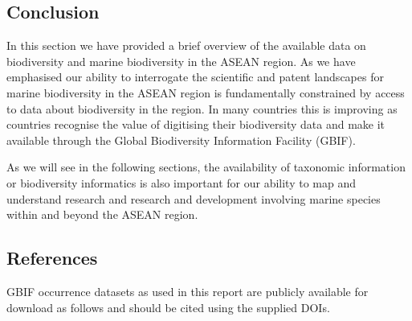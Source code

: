 \documentclass[]{book}
\theoremstyle{definition}
\theoremstyle{definition}
\theoremstyle{definition}
\theoremstyle{remark}
\begin{document}
\hypertarget{conclusion}{%
\subsection{Conclusion}\label{conclusion}}

In this section we have provided a brief overview of the available data
on biodiversity and marine biodiversity in the ASEAN region. As we have
emphasised our ability to interrogate the scientific and patent
landscapes for marine biodiversity in the ASEAN region is fundamentally
constrained by access to data about biodiversity in the region. In many
countries this is improving as countries recognise the value of
digitising their biodiversity data and make it available through the
Global Biodiversity Information Facility (GBIF).

As we will see in the following sections, the availability of taxonomic
information or biodiversity informatics is also important for our
ability to map and understand research and research and development
involving marine species within and beyond the ASEAN region.

\hypertarget{references}{%
\subsection{References}\label{references}}

GBIF occurrence datasets as used in this report are publicly available
for download as follows and should be cited using the supplied DOIs.
\end{document}
